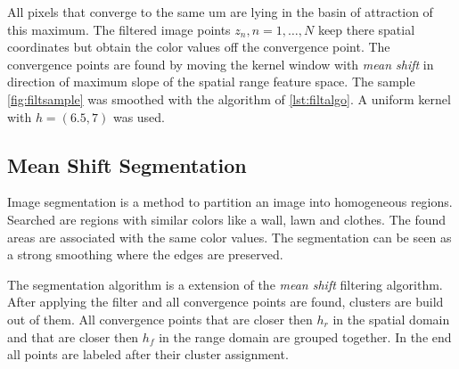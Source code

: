 All pixels that converge to the same um are lying in the basin of attraction
of this maximum. The filtered image points $z_n, n = 1 , \ldots , N$ keep there
spatial coordinates but obtain the color values off the convergence point. The
convergence points are found by moving the kernel window with \emph{mean shift} 
in direction of maximum slope of the spatial range feature space. The sample
\autoref{fig:filtsample} was smoothed with the algorithm of \autoref{lst:filtalgo}. 
A uniform kernel with $h = (6.5, 7)$ was used.

\subsection{Mean Shift Segmentation} %
\label{sub:mean_shift_segmentation}
Image segmentation is a method to partition an image into homogeneous regions. 
Searched are regions with similar colors like a wall, lawn and clothes. 
The found areas are associated with the same color values. The segmentation 
can be seen as a strong smoothing where the edges are preserved. 

The segmentation algorithm is a extension of the \emph{mean shift } filtering
algorithm. After applying the filter and all convergence points are found,
clusters are build out of them. All convergence points that are closer then
$h_r$ in the spatial domain and that are closer then $h_f$ in the range domain
are grouped together. In the end all points are labeled after their cluster
assignment.

